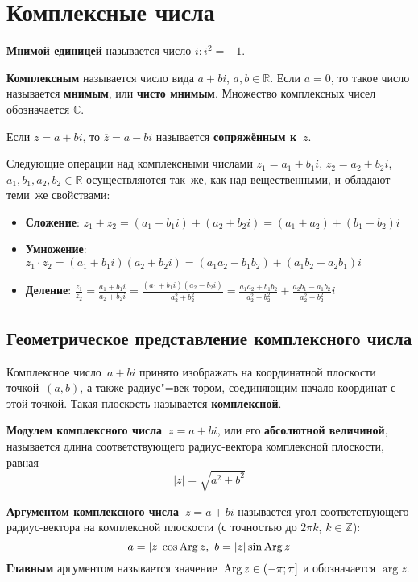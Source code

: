 \section{Комплексные числа}
  \textbf{Мнимой единицей} называется число $i \colon i^2 = -1$.

 \textbf{Комплексным} называется число вида $a + bi$, $a, b \in \mathbb R$.
 Если $a = 0$, то такое число называется \textbf{мнимым}, или \textbf{чисто мнимым}.
 Множество комплексных чисел обозначается $\mathbb C$.

Если $z = a + bi$, то $\overline z = a - bi$ называется \textbf{сопряжённым к~$z$}.

Следующие операции над комплексными числами $z_1 = a_1 + b_1 i$, $z_2 = a_2 + b_2 i$, $a_1, b_1, a_2, b_2 \in \mathbb R$ осуществляются так~же, как над вещественными, и обладают теми~же свойствами:
\begin{itemize}
	\item \textbf{Сложение}: $z_1 + z_2 = (a_1 + b_1 i) + (a_2 + b_2 i) = (a_1 + a_2) + (b_1 + b_2)i$
	\item \textbf{Умножение}: $z_1 \cdot z_2 = (a_1 + b_1 i)(a_2 + b_2 i) = (a_1 a_2 - b_1 b_2) + (a_1 b_2 + a_2 b_1)i$
	\item \textbf{Деление}: $\displaystyle \frac{z_1}{z_2} = \frac{a_1 + b_1 i}{a_2 + b_2 i} =
	\frac{(a_1 + b_1 i)(a_2 - b_2 i)}{a_2^2 + b_2^2} =
	\frac{a_1 a_2 + b_1 b_2}{a_2^2 + b_2^2} + \frac{a_2 b_1 - a_1 b_2}{a_2^2 + b_2^2} i$
\end{itemize}

\subsection{Геометрическое представление комплексного числа}
Комплексное число~$a + bi$ принято изображать на координатной плоскости точкой~$(a, b)$, а также радиус"=век-\linebreak тором, соединяющим начало координат с этой точкой.
Такая плоскость называется \textbf{комплексной}.

\textbf{Модулем комплексного числа~$z = a + bi$}, или его \textbf{абсолютной величиной}, называется длина соответствующего радиус-вектора комплексной плоскости, равная
\begin{equation*}
|z| = \sqrt{a^2 + b^2}
\end{equation*}

 \textbf{Аргументом комплексного числа~$z = a + bi$} называется угол соответствующего радиус-вектора на комплексной плоскости (с точностью до $2\pi k$, $k \in \mathbb Z$):
\begin{equation*}
a = |z| \cos \operatorname{Arg} z, \ b = |z| \sin \operatorname{Arg} z
\end{equation*}
 \textbf{Главным} аргументом называется значение~$\operatorname{Arg} z \in (-\pi; \pi]$ и обозначается $\arg z$.

